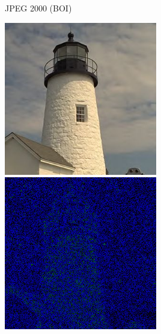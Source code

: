 \documentclass{beamer}
\begin{document}
\begin{frame}{JPEG 2000 (BOI)}
   \begin{multicols}{2}
      \includegraphics[width=0.5\textwidth]{figure/BOI_lighthouse050.jpg}
      \includegraphics[width=0.5\textwidth]{figure/psnr_BOI_lighthouse050.png}
   \end{multicols}
\end{frame}
\end{document}
